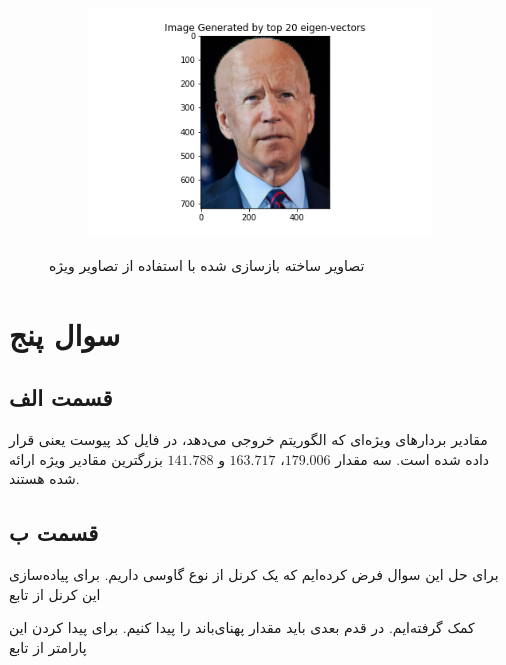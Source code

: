 \documentclass{article}
\begin{document}
\begin{figure}[h]
\begin{subfigure}{0.2\linewidth}
    \end{subfigure}
    \hfill
    \begin{subfigure}{0.2\linewidth}
        \centering
        \includegraphics[scale=0.2]{images/q4/joe/joe_20.png}
    \end{subfigure}
    \caption{تصاویر ساخته بازسازی شده با استفاده از تصاویر ویژه}
    \label{joe}
\end{figure}

\section*{سوال پنج}

\subsection*{قسمت الف}

مقادیر بردار‌های ویژه‌ای که الگوریتم  خروجی می‌دهد، در فایل کد پیوست یعنی 
قرار داده شده است. سه مقدار $179.006$، $163.717$ و $141.788$ بزرگترین مقادیر ویژه ارائه شده
هستند.

\subsection*{قسمت ب}

برای حل این سوال فرض کرده‌ایم که یک کرنل از نوع گاوسی داریم. برای پیاده‌سازی این کرنل از تابع

\begin{center}
\end{center}

کمک گرفته‌ایم. در قدم بعدی باید مقدار پهنای‌باند را پیدا کنیم. برای پیدا کردن این پارامتر از تابع

\begin{center}
\end{center}
\end{document}
